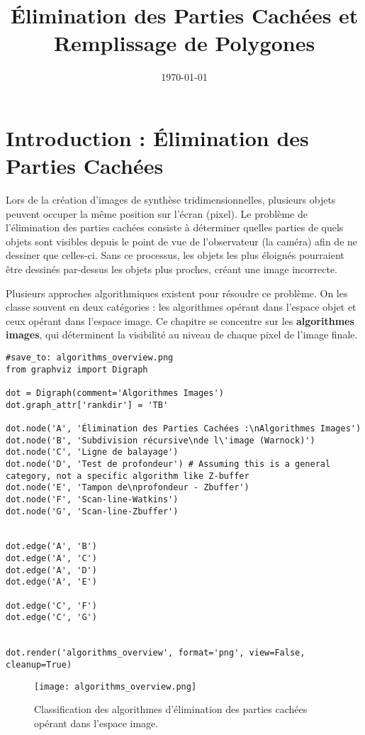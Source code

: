 \documentclass{article}
\title{Élimination des Parties Cachées et Remplissage de Polygones}
\date{\today}
\begin{document}
\maketitle
\sloppy

\section{Introduction : Élimination des Parties Cachées}

Lors de la création d'images de synthèse tridimensionnelles, plusieurs objets peuvent occuper la même position sur l'écran (pixel). Le problème de l'élimination des parties cachées consiste à déterminer quelles parties de quels objets sont visibles depuis le point de vue de l'observateur (la caméra) afin de ne dessiner que celles-ci. Sans ce processus, les objets les plus éloignés pourraient être dessinés par-dessus les objets plus proches, créant une image incorrecte.

Plusieurs approches algorithmiques existent pour résoudre ce problème. On les classe souvent en deux catégories : les algorithmes opérant dans l'espace objet et ceux opérant dans l'espace image. Ce chapitre se concentre sur les \textbf{algorithmes images}, qui déterminent la visibilité au niveau de chaque pixel de l'image finale.

\begin{verbatim}
#save_to: algorithms_overview.png
from graphviz import Digraph

dot = Digraph(comment='Algorithmes Images')
dot.graph_attr['rankdir'] = 'TB'

dot.node('A', 'Élimination des Parties Cachées :\nAlgorithmes Images')
dot.node('B', 'Subdivision récursive\nde l\'image (Warnock)')
dot.node('C', 'Ligne de balayage')
dot.node('D', 'Test de profondeur') # Assuming this is a general category, not a specific algorithm like Z-buffer
dot.node('E', 'Tampon de\nprofondeur - Zbuffer')
dot.node('F', 'Scan-line-Watkins')
dot.node('G', 'Scan-line-Zbuffer')


dot.edge('A', 'B')
dot.edge('A', 'C')
dot.edge('A', 'D')
dot.edge('A', 'E')

dot.edge('C', 'F')
dot.edge('C', 'G')


dot.render('algorithms_overview', format='png', view=False, cleanup=True)
\end{verbatim}

\begin{figure}[H]
\centering
\texttt{[image: algorithms\_overview.png]}
\caption{Classification des algorithmes d'élimination des parties cachées opérant dans l'espace image.}
\label{fig:algo_overview}
\end{figure}
\end{document}
